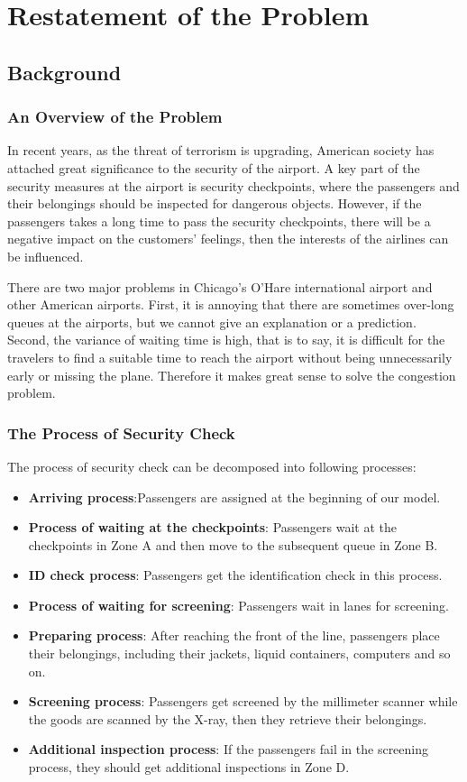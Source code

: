 \documentclass{mcmthesis}
\begin{document}
\newpage
\tableofcontents
\newpage

\section{Restatement of the Problem}
\subsection{Background}
\subsubsection{An Overview of the Problem}
\par In recent years, as the threat of terrorism is upgrading, American society has attached
great significance to the security of the airport. A key part of the security measures at
the airport is security checkpoints, where the passengers and their belongings should be
inspected for dangerous objects. However, if the passengers takes a long time to pass the
security checkpoints, there will be a negative impact on the customers' feelings, then the
interests of the airlines can be influenced.
\par There are two major problems in Chicago's O'Hare international airport and other
American airports. First, it is annoying that there are sometimes over-long queues at
the airports, but we cannot give an explanation or a prediction. Second, the variance of
waiting time is high, that is to say, it is difficult for the travelers to find a suitable time
to reach the airport without being unnecessarily early or missing the plane. Therefore it
makes great sense to solve the congestion problem.

\subsubsection{The Process of Security Check}
The process of security check can be decomposed into following processes:
\begin{itemize}
\item \textbf{Arriving process}:Passengers are assigned at the beginning of our model.
\item \textbf{Process of waiting at the checkpoints}: Passengers wait at the checkpoints in Zone
A and then move to the subsequent queue in Zone B.
\item \textbf{ID check process}: Passengers get the identification check in this process.
\item \textbf{Process of waiting for screening}: Passengers wait in lanes for screening.
\item \textbf{Preparing process}: After reaching the front of the line, passengers place their belongings, including their jackets, liquid containers, computers and so on.
\item \textbf{Screening process}: Passengers get screened by the millimeter scanner while the
goods are scanned by the X-ray, then they retrieve their belongings.
\item \textbf{Additional inspection process}: If the passengers fail in the screening process, they
should get additional inspections in Zone D.
\end{itemize}
\end{document}
